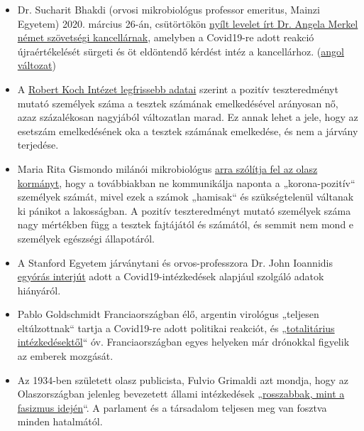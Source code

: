 \begin{itemize}
\tightlist
\item
  Dr. Sucharit Bhakdi (orvosi mikrobiológus professor emeritus, Mainzi
  Egyetem) 2020. március 26-án, csütörtökön
  \href{https://swprs.org/offener-brief-von-professor-sucharit-bhakdi-an-bundeskanzlerin-dr-angela-merkel/}{nyílt
  levelet írt Dr. Angela Merkel német szövetségi kancellárnak}, amelyben
  a Covid19-re adott reakció újraértékelését sürgeti és öt eldöntendő
  kérdést intéz a kancellárhoz.
  (\href{https://swprs.org/open-letter-from-professor-sucharit-bhakdi-to-german-chancellor-dr-angela-merkel/}{angol
  változat})
\item
  A
  \href{https://multipolar-magazin.de/artikel/coronavirus-irrefuhrung-fallzahlen}{Robert
  Koch Intézet legfrissebb adatai} szerint a pozitív teszteredményt
  mutató személyek száma a tesztek számának emelkedésével arányosan nő,
  azaz százalékosan nagyjából változatlan marad. Ez annak lehet a jele,
  hogy az esetszám emelkedésének oka a tesztek számának emelkedése, és
  nem a járvány terjedése.
\item
  Maria Rita Gismondo milánói mikrobiológus
  \href{https://www.secoloditalia.it/2020/03/coronavirus-la-gismondo-ammonisce-duramente-basta-snocciolare-numeri-sui-positivi-sono-dati-falsati/}{arra
  szólítja fel az olasz kormányt}, hogy a továbbiakban ne kommunikálja
  naponta a „korona-pozitív`` személyek számát, mivel ezek a számok
  „hamisak`` és szükségtelenül váltanak ki pánikot a lakosságban. A
  pozitív teszteredményt mutató személyek száma nagy mértékben függ a
  tesztek fajtájától és számától, és semmit nem mond e személyek
  egészségi állapotáról.
\item
  A Stanford Egyetem járványtani és orvos-professzora Dr. John Ioannidis
  \href{https://www.youtube.com/watch?v=d6MZy-2fcBw}{egyórás interjút}
  adott a Covid19-intézkedések alapjául szolgáló adatok hiányáról.
\item
  Pablo Goldschmidt Franciaországban élő, argentin virológus „teljesen
  eltúlzottnak`` tartja a Covid19-re adott politikai reakciót, és
  „\href{https://www.infobae.com/coronavirus/2020/03/28/para-un-prestigioso-cientifico-argentino-el-coronavirus-no-merece-que-el-planeta-este-en-un-estado-de-parate-total/}{totalitárius
  intézkedésektől}`` óv. Franciaországban egyes helyeken már drónokkal
  figyelik az emberek mozgását.
\item
  Az 1934-ben született olasz publicista, Fulvio Grimaldi azt mondja,
  hogy az Olaszországban jelenleg bevezetett állami intézkedések
  „\href{https://www.youtube.com/watch?v=O3BuNp01vpc}{rosszabbak, mint a
  fasizmus idején}``. A parlament és a társadalom teljesen meg van
  fosztva minden hatalmától.
\end{itemize}

